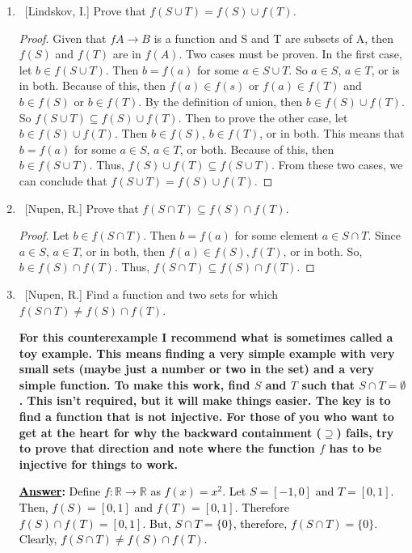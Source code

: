 \documentclass[10pt]{article}
\begin{document}
\begin{enumerate}
\begin{enumerate}
	\item  ~[Lindskov, I.] Prove that $f(S \cup T) = f(S) \cup f(T)$.
 \begin{proof}
Given that $f A\rightarrow B$ is a function and S and T are subsets of A, then $f(S)$ and $f(T)$ are in $f(A)$.  Two cases must be proven. 
  In the first case, let $b \in f(S \cup T)$.  Then $b = f(a)$ for some $a \in S \cup T$.  So $a \in S$, $a \in T$, or is in both.  Because of this, then $f(a) \in f(s)$ or $f(a) \in f(T)$ and $b \in f(S)$ or $b \in f(T)$.  By the definition of union, then $b \in f(S) \cup f(T)$.  So $f(S \cup T) \subseteq f(S) \cup f(T)$.  Then to prove the other case, let $b \in f(S) \cup f(T)$.  Then $b \in f(S)$, $b \in f(T)$, or in both.  This means that $b = f(a)$ for some $a \in S$, $a \in T$, or both.  Because of this, then $b \in f(S \cup T)$.  Thus, $f(S) \cup f(T) \subseteq f(S \cup T)$.  From these two cases, we can conclude that $f(S \cup T) = f(S) \cup f(T)$.
 \end{proof}
	\item  ~[Nupen, R.] Prove that $f(S \cap T) \subseteq f(S) \cap f(T)$.
\begin{proof}
Let $b \in f(S \cap T)$. Then $b = f(a)$ for some element $a \in S \cap T$.  Since $a \in S$, $a \in T$, or in both, then $f(a) \in f(S), f(T)$, or in both.  So, $b \in f(S) \cap f(T)$.  Thus, $f(S \cap T) \subseteq f(S) \cap f(T)$.
\end{proof}
    
	\item  ~[Nupen, R.] Find a function and two sets for which $f(S \cap T) \neq f(S) \cap f(T)$.
	
	\textbf{For this counterexample I recommend what is sometimes called a toy example.  This means finding a very simple example with very small sets (maybe just a number or two in the set) and a very simple function.  To make this work, find $S$ and $T$ such that $S \cap T = \emptyset$.  This isn't required, but it will make things easier.  The key is to find a function that is not injective.  For those of you who want to get at the heart for why the backward containment ($\supseteq$) fails, try to prove that direction and note where the function $f$ has to be injective for things to work.}
 \par \medskip
  \textbf{\textcolor{black}{\underline{Answer}:}}
{\textcolor{black}{Define $f: \mathbb{R} \rightarrow \mathbb{R}$ as $f(x) = x^2$.  Let $S = [-1, 0]$ and $T = [0,1]$.  Then, $f(S) = [0,1]$ and $f(T) = [0,1]$.  Therefore $f(S) \cap f(T) = [0,1]$.  But, $S \cap T = \{0\}$, therefore, $f(S \cap T) = \{0\}$.  Clearly, $f(S \cap T) \neq f(S) \cap f(T)$.}}
	

\end{enumerate}
\end{enumerate}
\end{document}
